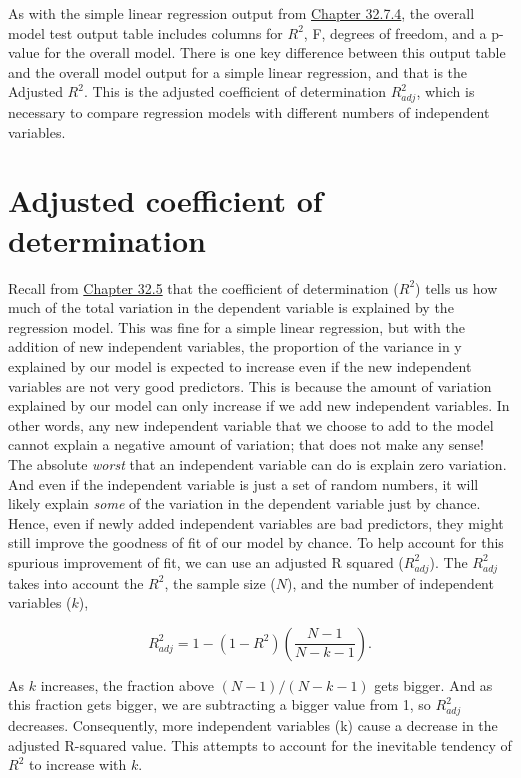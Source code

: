 \documentclass[
  openany]{scrbook}
\begin{document}
As with the simple linear regression output from \protect\hyperlink{simple-regression-output}{Chapter 32.7.4}, the overall model test output table includes columns for \(R^{2}\), F, degrees of freedom, and a p-value for the overall model.
There is one key difference between this output table and the overall model output for a simple linear regression, and that is the Adjusted \(R^{2}\).
This is the adjusted coefficient of determination \(R^{2}_{adj}\), which is necessary to compare regression models with different numbers of independent variables.

\hypertarget{adjusted-coefficient-of-determination}{%
\section{Adjusted coefficient of determination}\label{adjusted-coefficient-of-determination}}

Recall from \protect\hyperlink{coefficient-of-determination}{Chapter 32.5} that the coefficient of determination (\(R^{2}\)) tells us how much of the total variation in the dependent variable is explained by the regression model.
This was fine for a simple linear regression, but with the addition of new independent variables, the proportion of the variance in y explained by our model is expected to increase even if the new independent variables are not very good predictors.
This is because the amount of variation explained by our model can only increase if we add new independent variables.
In other words, any new independent variable that we choose to add to the model cannot explain a negative amount of variation; that does not make any sense!
The absolute \emph{worst} that an independent variable can do is explain zero variation.
And even if the independent variable is just a set of random numbers, it will likely explain \emph{some} of the variation in the dependent variable just by chance.
Hence, even if newly added independent variables are bad predictors, they might still improve the goodness of fit of our model by chance.
To help account for this spurious improvement of fit, we can use an adjusted R squared (\(R^{2}_{adj}\)).
The \(R^{2}_{adj}\) takes into account the \(R^{2}\), the sample size (\(N\)), and the number of independent variables (\(k\)),

\[R^{2}_{adj} = 1 - \left(1 - R^{2}\right)\left(\frac{N - 1}{N - k - 1}\right).\]

As \(k\) increases, the fraction above \((N-1)/(N-k-1)\) gets bigger.
And as this fraction gets bigger, we are subtracting a bigger value from 1, so \(R^{2}_{adj}\) decreases.
Consequently, more independent variables (k) cause a decrease in the adjusted R-squared value.
This attempts to account for the inevitable tendency of \(R^{2}\) to increase with \(k\).
\end{document}

